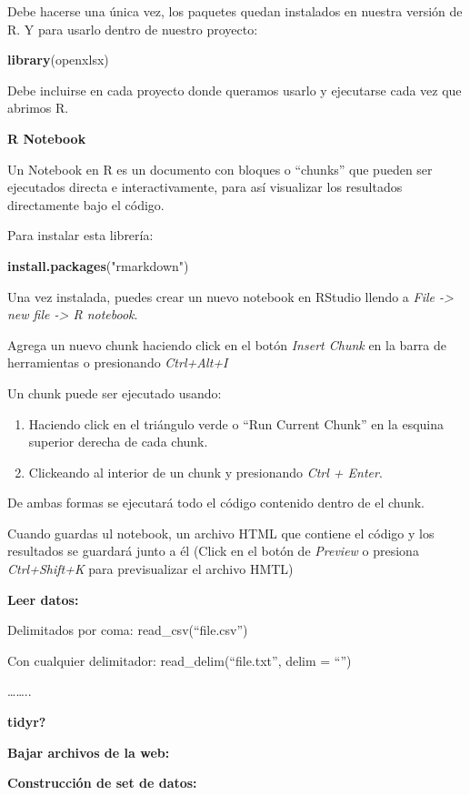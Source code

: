 \documentclass[
]{book}
\newenvironment{Shaded}{\begin{snugshade}}{\end{snugshade}}
\newcommand{\FunctionTok}[1]{\textcolor[rgb]{0.13,0.29,0.53}{\textbf{#1}}}
\newcommand{\NormalTok}[1]{#1}
\newcommand{\StringTok}[1]{\textcolor[rgb]{0.31,0.60,0.02}{#1}}
\begin{document}
Debe hacerse una única vez, los paquetes quedan instalados en nuestra
versión de R. Y para usarlo dentro de nuestro proyecto:

\begin{Shaded}
\begin{Highlighting}[]
\FunctionTok{library}\NormalTok{(openxlsx)}
\end{Highlighting}
\end{Shaded}

Debe incluirse en cada proyecto donde queramos usarlo y ejecutarse cada
vez que abrimos R.

\textbf{R Notebook}

Un Notebook en R es un documento con bloques o ``chunks'' que pueden ser
ejecutados directa e interactivamente, para así visualizar los
resultados directamente bajo el código.

Para instalar esta librería:

\begin{Shaded}
\begin{Highlighting}[]
\FunctionTok{install.packages}\NormalTok{(}\StringTok{"rmarkdown"}\NormalTok{)}
\end{Highlighting}
\end{Shaded}

Una vez instalada, puedes crear un nuevo notebook en RStudio llendo a
\emph{File -\textgreater{} new file -\textgreater{} R notebook}.

Agrega un nuevo chunk haciendo click en el botón \emph{Insert Chunk} en la
barra de herramientas o presionando \emph{Ctrl+Alt+I}

Un chunk puede ser ejecutado usando:

\begin{enumerate}
\def\labelenumi{\arabic{enumi}.}
\item
  Haciendo click en el triángulo verde o ``Run Current Chunk'' en la
  esquina superior derecha de cada chunk.
\item
  Clickeando al interior de un chunk y presionando \emph{Ctrl + Enter}.
\end{enumerate}

De ambas formas se ejecutará todo el código contenido dentro de el
chunk.

Cuando guardas ul notebook, un archivo HTML que contiene el código y los
resultados se guardará junto a él (Click en el botón de \emph{Preview} o
presiona \emph{Ctrl+Shift+K} para previsualizar el archivo HMTL)

\textbf{Leer datos:}

Delimitados por coma: read\_csv(``file.csv'')

Con cualquier delimitador: read\_delim(``file.txt'', delim = ``\textbar{}'')

\ldots\ldots..

\textbf{tidyr?}

\textbf{Bajar archivos de la web:}

\textbf{Construcción de set de datos:}

  
\end{document}
